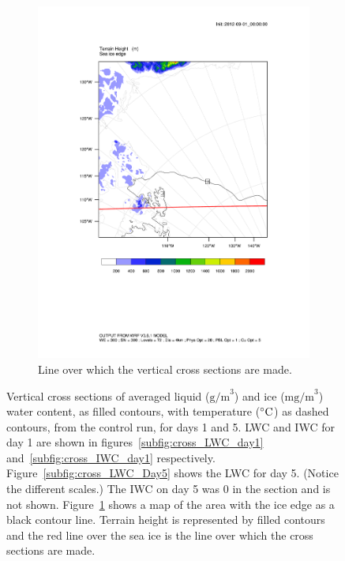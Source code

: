 \begin{figure}
\begin{subfigure}{0.48\textwidth}
        \includegraphics[width=\textwidth]{results/control/crossSec_line.pdf}
        \caption{Line over which the vertical cross sections are made.}
        \label{subfig:cross_line}
    \end{subfigure}
    \caption{Vertical cross sections of averaged liquid ($\text{g/m}^3$) and ice  ($\text{mg/m}^3$) water content, as filled contours, with temperature ($\degree\text{C}$) as dashed contours, from the control run, for days 1 and 5. LWC and IWC for day 1 are shown in figures~\ref{subfig:cross_LWC_day1} and~\ref{subfig:cross_IWC_day1} respectively. Figure~\ref{subfig:cross_LWC_Day5} shows the LWC for day 5. (Notice the different scales.) The IWC on day 5 was 0 in the section and is not shown. Figure~\ref{subfig:cross_line} shows a map of the area with the ice edge as a black contour line. Terrain height is represented by filled contours and the red line over the sea ice is the line over which the cross sections are made.}
    \label{fig:sections}
\end{figure}

